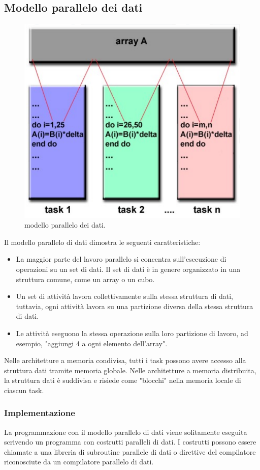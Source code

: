 \subsection{Modello parallelo dei dati}
\begin{figure}[th]
	\centering
	\includegraphics[width=0.7\linewidth]{img/modello-parallelo-dei-dati}
	\caption{modello parallelo dei dati.}
	\label{fig:modello-parallelo-dei-dati}
\end{figure}

Il modello parallelo di dati dimostra le seguenti caratteristiche:
\begin{itemize}
	\item La maggior parte del lavoro parallelo si concentra
	sull'esecuzione di operazioni su un set di dati.
	Il set di dati è in genere organizzato in
	una struttura comune, come un array
	o un cubo.
	\item Un set di attività lavora collettivamente sulla
	stessa struttura di dati, tuttavia, ogni
	attività lavora su una partizione diversa della
	stessa struttura di dati.
	\item Le attività eseguono la stessa operazione sulla
	loro partizione di lavoro, ad esempio,
	"aggiungi 4 a ogni elemento dell'array".
\end{itemize}
Nelle architetture a memoria condivisa, tutti i task possono avere accesso alla
struttura dati tramite memoria globale. Nelle architetture a memoria distribuita, la struttura dati è suddivisa e risiede come "blocchi"
nella memoria locale di ciascun task.
\subsubsection*{Implementazione}
La programmazione con il modello parallelo di dati viene solitamente eseguita scrivendo un programma con costrutti paralleli di dati. I costrutti possono essere chiamate a una libreria di subroutine parallele di dati o direttive del compilatore riconosciute da un compilatore parallelo di dati.
